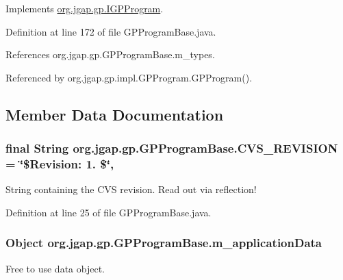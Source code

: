 Implements \hyperlink{interfaceorg_1_1jgap_1_1gp_1_1_i_g_p_program_acda6cbcb0dd4f9db114632f3131f817e}{org.\-jgap.\-gp.\-I\-G\-P\-Program}.



Definition at line 172 of file G\-P\-Program\-Base.\-java.



References org.\-jgap.\-gp.\-G\-P\-Program\-Base.\-m\-\_\-types.



Referenced by org.\-jgap.\-gp.\-impl.\-G\-P\-Program.\-G\-P\-Program().



\subsection{Member Data Documentation}
\hypertarget{classorg_1_1jgap_1_1gp_1_1_g_p_program_base_a2dc3eaded7e86b4f604e561607a3a0c4}{
\subsubsection[{C\-V\-S\-\_\-\-R\-E\-V\-I\-S\-I\-O\-N}]{\setlength{\rightskip}{0pt plus 5cm}final String org.\-jgap.\-gp.\-G\-P\-Program\-Base.\-C\-V\-S\-\_\-\-R\-E\-V\-I\-S\-I\-O\-N = \char`\"{}\$Revision\-: 1. \$\char`\"{}\hspace{0.3cm}{\ttfamily [static]}, {\ttfamily [private]}}}\label{classorg_1_1jgap_1_1gp_1_1_g_p_program_base_a2dc3eaded7e86b4f604e561607a3a0c4}
String containing the C\-V\-S revision. Read out via reflection! 

Definition at line 25 of file G\-P\-Program\-Base.\-java.

\hypertarget{classorg_1_1jgap_1_1gp_1_1_g_p_program_base_a9ef4ec5ae5c5f28ae0ce01770145d14b}{
\subsubsection[{m\-\_\-application\-Data}]{\setlength{\rightskip}{0pt plus 5cm}Object org.\-jgap.\-gp.\-G\-P\-Program\-Base.\-m\-\_\-application\-Data\hspace{0.3cm}{\ttfamily [private]}}}\label{classorg_1_1jgap_1_1gp_1_1_g_p_program_base_a9ef4ec5ae5c5f28ae0ce01770145d14b}
Free to use data object. 

